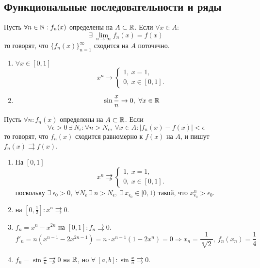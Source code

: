 \subsection{Функциональные последовательности и ряды}
\begin{definition}
    Пусть $\forall n\in \mathbb{N}: f_n(x)$ определены на $A\subset \mathbb{R}$. Если $\forall x\in A$: 
    \[\exists\ \lim\limits_{n\to\infty}f_n(x)=f(x)\]
    то говорят, что $\{f_n(x)\}_{n=1}^{\infty}$ сходится на $A$ поточечно.
\end{definition}
\begin{examples}\tab
    \begin{enumerate}
        \item $\forall x\in[0,1]$
        \[x^n\to \begin{cases}
            1,\ x=1,\\
            0,\ x\in [0,1].
        \end{cases}\]
        \item 
        \[\sin{\frac{x}{n}}\to 0,\ \forall x\in \mathbb{R}\]
    \end{enumerate}
\end{examples}
\begin{definition}
    Пусть $\forall n: f_n(x)$ определены на $A\subset \mathbb{R}$. Если 
    \[\forall \epsilon>0\ \exists\ N_{\epsilon}: \forall n>N_{\epsilon},\ \forall x\in A: |f_n(x)-f(x)|<\epsilon\]
    то говорят, что $f_n(x)$ сходится равномерно к $f(x)$ на $A$, и пишут $f_n(x)\rightrightarrows f(x)$.
\end{definition}
\begin{examples}\tab
    \begin{enumerate}
        \item На $[0,1]$
        \[x^n \not\rightrightarrows \begin{cases}
            1,\ x=1,\\
            0,\ x\in [0,1].
        \end{cases} \]
        поскольку $\exists\ \epsilon_0>0,\ \forall N_{\epsilon}\ \exists\ n>N_{\epsilon},\ \exists\ x_{\epsilon_0}\in [0,1)$ такой, что $x_{\epsilon_0}^n>\epsilon_0$.
        \item на $[0,\frac{1}{2}]: x^n\rightrightarrows 0$.
        \item $f_n=x^n-x^{2n}$ на $[0,1]: f_n\rightrightarrows 0$.
        \[f'_n=n(x^{n-1}-2x^{2n-1})=n\cdot x^{n-1}(1-2x^n)=0 \Rightarrow x_n=\frac{1}{\sqrt[n]{2}},\ f_n(x_n)=\frac{1}{4}\]
        \item $f_n=\sin{\frac{x}{n}} \not\rightrightarrows 0$ на $\mathbb{R}$, но $\forall\ [a,b]: \sin{\frac{x}{n}}\rightrightarrows 0$.
    \end{enumerate}
\end{examples}
